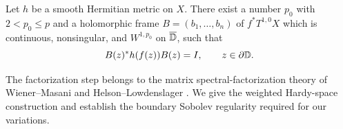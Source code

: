 \begin{proposition}\label{var:frame}
Let $h$ be a smooth Hermitian metric on $X$.  There exist a number
$p_0$ with $2<p_0\le p$ and a holomorphic frame
$B=(b_1,\ldots,b_n)$ of $f^*T^{1,0}X$ which is continuous,
nonsingular, and $W^{1,p_0}$ on $\overline{\mathbb D}$, such that
\begin{equation}\label{var:boundary-unitary}
 B(z)^*h(f(z))B(z)=I,
 \qquad z\in\partial\mathbb D.
\end{equation}
\end{proposition}

The factorization step belongs to the matrix spectral-factorization
theory of Wiener--Masani and Helson--Lowdenslager
\cite{WienerMasani1957,HelsonLowdenslager1958}. We give the weighted
Hardy-space construction and establish the boundary Sobolev regularity
required for our variations.

